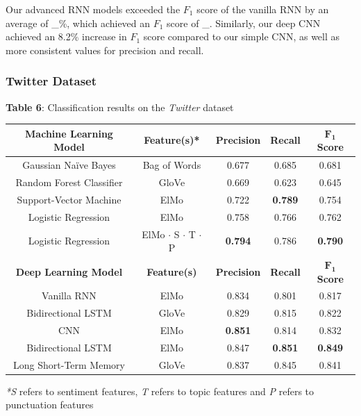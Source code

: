 \documentclass[12pt,a4paper]{article}
\begin{document}
Our advanced RNN models exceeded the $F_1$ score of the vanilla RNN by an average of \_\%, which achieved an $F_1$ score of \_. Similarly, our deep CNN achieved an 8.2\% increase in $F_1$ score compared to our simple CNN, as well as more consistent values for precision and recall.

\subsubsection{Twitter Dataset}

\begin{center}
	\textbf{Table 6}: Classification results on the \textit{Twitter} dataset
\end{center}

\begin{center}
	\begin{tabular}{ |c||c|c|c|c|}
		\hline
		\textbf{Machine Learning Model}& \textbf{Feature(s)*} & \textbf{Precision} & \textbf{Recall} & \textbf{$\mathbf{F_1}$ Score}\\
		\hline\hline
		Gaussian Na\"{i}ve Bayes & Bag of Words & 0.677 & 0.685 & 0.681\\
		Random Forest Classifier & GloVe  & 0.669   & 0.623 & 0.645\\
		Support-Vector Machine & ElMo  & 0.722 & \textbf{0.789} & 0.754\\
		Logistic Regression & ElMo  & 0.758 & 0.766 & 0.762\\
		Logistic Regression & ElMo $\cdot$ S $\cdot$ T $\cdot$ P & \textbf{0.794} & 0.786 & \textbf{0.790}\\
		\hline\hline
		\textbf{Deep Learning Model}& \textbf{Feature(s)} & \textbf{Precision} & \textbf{Recall} & \textbf{$\mathbf{F_1}$ Score}\\
		\hline
		Vanilla RNN & ElMo  & 0.834   & 0.801 & 0.817\\
		Bidirectional LSTM & GloVe  & 0.829 & 0.815 & 0.822\\
		CNN & ElMo  & \textbf{0.851}   & 0.814 & 0.832\\
		Bidirectional LSTM & ElMo  & 0.847   & \textbf{0.851} & \textbf{0.849}\\
		Long Short-Term Memory & GloVe & 0.837   & 0.845 & 0.841\\
		\hline
	\end{tabular}
\end{center}
\textit{*S} refers to sentiment features, \textit{T} refers to topic features and \textit{P} refers to punctuation features\\
\end{document}
